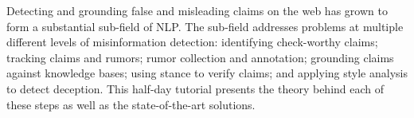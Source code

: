 Detecting and grounding false and misleading claims on the web has grown to form a substantial sub-field of NLP. The sub-field addresses problems at multiple different levels of misinformation detection: identifying check-worthy claims; tracking claims and rumors; rumor collection and annotation; grounding claims against knowledge bases; using stance to verify claims; and applying style analysis to detect deception. This half-day tutorial presents the theory behind each of these steps as well as the state-of-the-art solutions.
